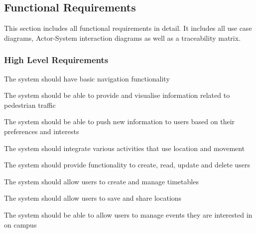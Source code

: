 \documentclass{article}
\begin{document}
	
	\subsection{Functional Requirements}
	This section includes all functional requirements in detail. It includes all use case diagrams, Actor-System interaction diagrams as well as a traceability matrix.	
	\subsubsection{High Level Requirements}
	\begin{FR}
		\item The system should have basic navigation functionality 
		\item The system should be able to provide and visualise information related to pedestrian traffic
		\item The system should be able to push new information to users based on their preferences and interests
		\item The system should integrate various activities that use location and movement
		\item The system should provide functionality to create, read, update and delete users 
		\item The system should allow users to create and manage timetables
		\item The system should allow users to save and share locations
		\item The system should be able to allow users to manage events they are interested in on campus
	\end{FR}
\end{document}
